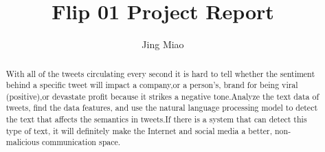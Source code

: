 \documentclass{amsart}
\begin{document}
%
%
\title[Flip 01 Project Report]{Flip 01 Project Report}%

\author{Jing Miao}
\address[A.~1]{School of Computer Science,\\
Qingdao University of Technology, Qingdao, China}%


%
\date{\gitAuthorDate}%

\begin{abstract}
With all of the tweets circulating every second it is hard to tell whether the sentiment behind a specific tweet will impact a company,or a person's, brand for being viral (positive),or devastate profit because it strikes a negative tone.Analyze the text data of tweets, find the data features, and use the natural language processing model to detect the text that affects the semantics in tweets.If there is a system that can detect this type of text, it will definitely make the Internet and social media a better, non-malicious communication space.
\end{abstract}

\maketitle
\tableofcontents

\newpage


\end{document}
